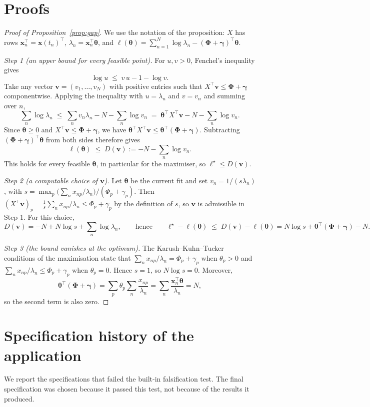 \section{Proofs}\label{app:proofs}

\begin{proof}[Proof of Proposition~\ref{prop:gap}]
We use the notation of the proposition: $X$ has rows $\bm x_n^\top=\bm x(t_n)^\top$,
$\lambda_n=\bm x_n^\top\bm\theta$, and
$\ell(\bm\theta)=\sum_{n=1}^{N}\log\lambda_n-(\bm\Phi+\bm\gamma)^\top\bm\theta$.

\emph{Step 1 (an upper bound for every feasible point).} For $u,v>0$, Fenchel's inequality gives
\[
\log u\;\le\;v\,u-1-\log v .
\]
Take any vector $\bm v=(v_1,\dots,v_N)$ with positive entries such that
$X^\top\bm v\le\bm\Phi+\bm\gamma$ componentwise. Applying the inequality with $u=\lambda_n$ and
$v=v_n$ and summing over $n$,
\[
\sum_{n}\log\lambda_n\;\le\;\sum_n v_n\lambda_n-N-\sum_n\log v_n
\;=\;\bm\theta^\top X^\top\bm v-N-\sum_n\log v_n .
\]
Since $\bm\theta\ge0$ and $X^\top\bm v\le\bm\Phi+\bm\gamma$, we have
$\bm\theta^\top X^\top\bm v\le\bm\theta^\top(\bm\Phi+\bm\gamma)$. Subtracting
$(\bm\Phi+\bm\gamma)^\top\bm\theta$ from both sides therefore gives
\[
\ell(\bm\theta)\;\le\;D(\bm v):=-N-\sum_n\log v_n .
\]
This holds for every feasible $\bm\theta$, in particular for the maximiser, so
$\ell^\star\le D(\bm v)$.

\emph{Step 2 (a computable choice of $\bm v$).} Let $\bm\theta$ be the current fit and set
$v_n=1/(s\lambda_n)$, with $s=\max_p\bigl(\sum_n x_{np}/\lambda_n\bigr)/(\Phi_p+\gamma_p)$. Then
$(X^\top\bm v)_p=\frac{1}{s}\sum_n x_{np}/\lambda_n\le\Phi_p+\gamma_p$ by the definition of $s$, so
$\bm v$ is admissible in Step 1. For this choice,
\[
D(\bm v)=-N+N\log s+\sum_n\log\lambda_n ,
\qquad\text{hence}\qquad
\ell^\star-\ell(\bm\theta)\;\le\;D(\bm v)-\ell(\bm\theta)=N\log s+\bm\theta^\top(\bm\Phi+\bm\gamma)-N .
\]

\emph{Step 3 (the bound vanishes at the optimum).} The Karush--Kuhn--Tucker conditions of the
maximisation state that $\sum_n x_{np}/\lambda_n=\Phi_p+\gamma_p$ when $\theta_p>0$ and
$\sum_n x_{np}/\lambda_n\le\Phi_p+\gamma_p$ when $\theta_p=0$. Hence $s=1$, so $N\log s=0$. Moreover,
\[
\bm\theta^\top(\bm\Phi+\bm\gamma)=\sum_p\theta_p\sum_n\frac{x_{np}}{\lambda_n}
=\sum_n\frac{\bm x_n^\top\bm\theta}{\lambda_n}=N ,
\]
so the second term is also zero.
\end{proof}

\section{Specification history of the application}\label{app:history}
We report the specifications that failed the built-in falsification test. The final
specification was chosen because it passed this test, not because of the results it produced.

